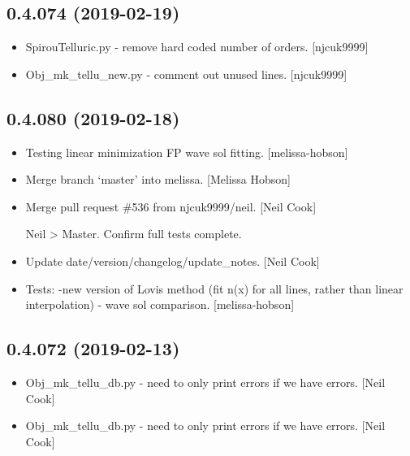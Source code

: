 \documentclass[a4paper,10pt,english]{report}
\begin{document}
\subsection{0.4.074 (2019-02-19)}
\label{\detokenize{misc/changelog:id182}}\begin{itemize}
\item {} 
SpirouTelluric.py - remove hard coded number of orders. {[}njcuk9999{]}

\item {} 
Obj\_mk\_tellu\_new.py - comment out unused lines. {[}njcuk9999{]}

\end{itemize}


\subsection{0.4.080 (2019-02-18)}
\label{\detokenize{misc/changelog:id183}}\begin{itemize}
\item {} 
Testing linear minimization FP wave sol fitting. {[}melissa-hobson{]}

\item {} 
Merge branch ‘master’ into melissa. {[}Melissa Hobson{]}

\item {} 
Merge pull request \#536 from njcuk9999/neil. {[}Neil Cook{]}

Neil \textendash{}\textgreater{} Master. Confirm full tests complete.

\item {} 
Update date/version/changelog/update\_notes. {[}Neil Cook{]}

\item {} 
Tests: -new version of Lovis method (fit n(x) for all lines, rather
than linear interpolation) - wave sol comparison. {[}melissa-hobson{]}

\end{itemize}


\subsection{0.4.072 (2019-02-13)}
\label{\detokenize{misc/changelog:id184}}\begin{itemize}
\item {} 
Obj\_mk\_tellu\_db.py - need to only print errors if we have errors.
{[}Neil Cook{]}

\item {} 
Obj\_mk\_tellu\_db.py - need to only print errors if we have errors.
{[}Neil Cook{]}

\end{itemize}
\end{document}
